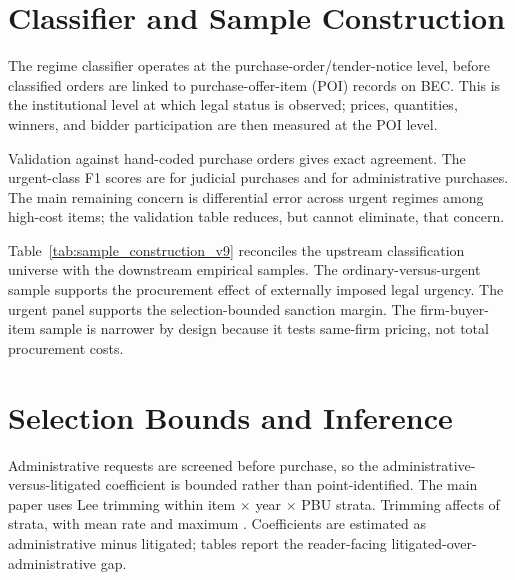 \section{Classifier and Sample Construction}
\label{app:classifier}

The regime classifier operates at the purchase-order/tender-notice
level, before classified orders are linked to purchase-offer-item
(POI) records on BEC. This is the institutional level at which legal
status is observed; prices, quantities, winners, and bidder
participation are then measured at the POI level.



Validation against \BPregexNGroundTruth{} hand-coded purchase orders
gives \BPregexExactMatchPct{} exact agreement. The urgent-class F1
scores are \BPregexFoneJud{} for judicial purchases and
\BPregexFoneAdm{} for administrative purchases. The main remaining
concern is differential error across urgent regimes among high-cost
items; the validation table reduces, but cannot eliminate, that
concern.



Table~\ref{tab:sample_construction_v9} reconciles the upstream
classification universe with the downstream empirical samples. The
ordinary-versus-urgent sample supports the procurement effect of
externally imposed legal urgency. The urgent panel supports the
selection-bounded sanction margin. The firm-buyer-item sample is
narrower by design because it tests same-firm pricing, not total
procurement costs.

\section{Selection Bounds and Inference}
\label{app:selection_inference}

Administrative requests are screened before purchase, so the
administrative-versus-litigated coefficient is bounded rather than
point-identified. The main paper uses Lee trimming within item
$\times$ year $\times$ PBU strata. Trimming affects
\BPutgLeeStrataExcess{} of \BPutgLeeStrataTotal{} strata, with mean
rate \BPutgLeeTrimMean{} and maximum \BPutgLeeTrimMax{}. Coefficients
are estimated as administrative minus litigated; tables report the
reader-facing litigated-over-administrative gap.



